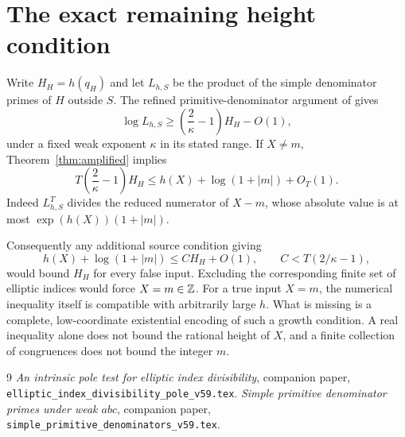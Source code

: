 \documentclass[11pt,a4paper]{article}
\begin{document}
\section{The exact remaining height condition}

Write $H_H=h(q_H)$ and let $L_{h,S}$ be the product of the
simple denominator primes of $H$ outside $S$. The refined
primitive-denominator argument of \cite{Simple} gives
\[
 \log L_{h,S}\ge\left(\frac2\kappa-1\right)H_H-O(1),
\]
under a fixed weak exponent $\kappa$ in its stated range.
If $X\ne m$, Theorem~\ref{thm:amplified} implies
\begin{equation}\label{eq:remaining}
 T\left(\frac2\kappa-1\right)H_H
           \le h(X)+\log(1+|m|)+O_T(1).
\end{equation}
Indeed $L_{h,S}^T$ divides the reduced numerator of $X-m$,
whose absolute value is at most
$\exp(h(X))(1+|m|)$.

Consequently any additional source condition giving
\[
       h(X)+\log(1+|m|)\le C H_H+O(1),
       \qquad C<T(2/\kappa-1),
\]
would bound $H_H$ for every false input. Excluding the
corresponding finite set of elliptic indices would force
$X=m\in\mathbb Z$. For a true input $X=m$, the numerical inequality
itself is compatible with arbitrarily large $h$.
What is missing is a complete, low-coordinate existential
encoding of such a growth condition. A real inequality alone
does not bound the rational height of $X$, and a finite
collection of congruences does not bound the integer $m$.

\begin{thebibliography}{9}
\emph{An intrinsic pole test for elliptic index
divisibility}, companion paper,
\nolinkurl{elliptic_index_divisibility_pole_v59.tex}.
\emph{Simple primitive denominator primes under weak
$abc$}, companion paper, \nolinkurl{simple_primitive_denominators_v59.tex}.
\end{thebibliography}
\end{document}
